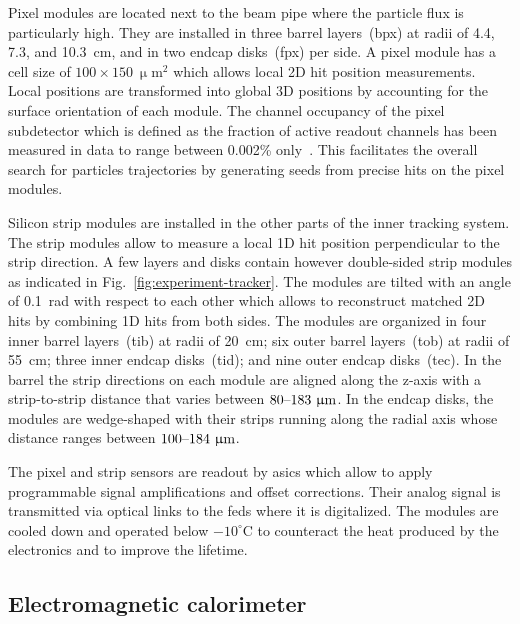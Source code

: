 Pixel modules are located next to the beam pipe where the particle flux is particularly high. They are installed in three barrel layers~(\gls{bpx}) at radii of 4.4, 7.3, and 10.3~cm, and in two endcap disks~(\gls{fpx}) per side. A pixel module has a cell size of $100\times150~\upmu\mathrm{m}^{2}$ which allows local 2D hit position measurements. Local positions are transformed into global 3D positions by accounting for the surface orientation of each module. The channel occupancy of the pixel subdetector which is defined as the fraction of active readout channels has been measured in data to range between 0.002\% only~\cite{Chatrchyan:2014fea}. This facilitates the overall search for particles trajectories by generating seeds from precise hits on the pixel modules.

Silicon strip modules are installed in the other parts of the inner tracking system. The strip modules allow to measure a local 1D hit position perpendicular to the strip direction. A few layers and disks contain however double-sided strip modules as indicated in Fig.~\ref{fig:experiment-tracker}. The modules are tilted with an angle of 0.1~rad with respect to each other which allows to reconstruct matched 2D hits by combining 1D hits from both sides. The modules are organized in four inner barrel layers~(\gls{tib}) at radii of 20~cm; six outer barrel layers~(\gls{tob}) at radii of 55~cm; three inner endcap disks~(\gls{tid}); and nine outer endcap disks~(\gls{tec}). In the barrel the strip directions on each module are aligned along the z-axis with a strip-to-strip distance that varies between $80\text{--}183~\upmu\mathrm{m}$. In the endcap disks, the modules are wedge-shaped with their strips running along the radial axis whose distance ranges between $100\text{--}184~\upmu\mathrm{m}$.

The pixel and strip sensors are readout by \glspl{asic} which allow to apply programmable signal amplifications and offset corrections. Their analog signal is transmitted via optical links to the \glspl{fed} where it is digitalized. The modules are cooled down and operated below $-10^\circ\mathrm{C}$ to counteract the heat produced by the electronics and to improve the lifetime. 

\subsection{Electromagnetic calorimeter}

